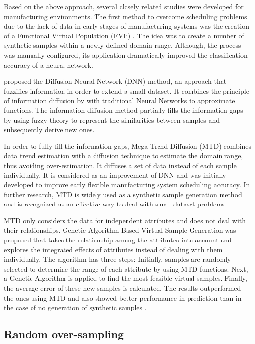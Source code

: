 \documentclass[parskip=full]{scrartcl}
\begin{document}
Based on the above approach, several closely related studies were developed for
manufacturing environments. The first method to overcome scheduling problems due
to the lack of data in early stages of manufacturing systems was the creation of
a Functional Virtual Population (FVP) \cite{Li.2003}. The idea was to create a
number of synthetic samples within a newly defined domain range. Although, the
process was manually configured, its application dramatically improved the
classification accuracy of a neural network. 

\cite{Huang.2004} proposed the Diffusion-Neural-Network (DNN) method, an
approach that fuzzifies information in order to extend a small dataset. It
combines the principle of information diffusion by \cite{Huang.1997} with
traditional Neural Networks to approximate functions. The information diffusion
method partially fills the information gaps by using fuzzy theory to represent
the similarities between samples and subsequently derive new ones.

In order to fully fill the information gaps, Mega-Trend-Diffusion (MTD)
\cite{Li.2007} combines data trend estimation with a diffusion technique to
estimate the domain range, thus avoiding over-estimation. It diffuses a set of
data instead of each sample individually. It is considered as an improvement of
DNN and was initially developed to improve early flexible manufacturing system
scheduling accuracy. In further research, MTD is widely used as a synthetic
sample generation method and is recognized as an effective way to deal with
small dataset problems \cite{AbdulLateh.2017}.

MTD only considers the data for independent attributes and does not deal with
their relationships. Genetic Algorithm Based Virtual Sample Generation was
proposed that takes the relationship among the attributes into account and
explores the integrated effects of attributes instead of dealing with them
individually. The algorithm has three steps: Initially, samples are randomly
selected to determine the range of each attribute by using MTD functions. Next,
a Genetic Algorithm is applied to find the most feasible virtual samples.
Finally, the average error of these new samples is calculated. The results
outperformed the ones using MTD and also showed better performance in prediction
than in the case of no generation of synthetic samples \cite{Li.2014}.

\subsection{Random over-sampling}
\end{document}
